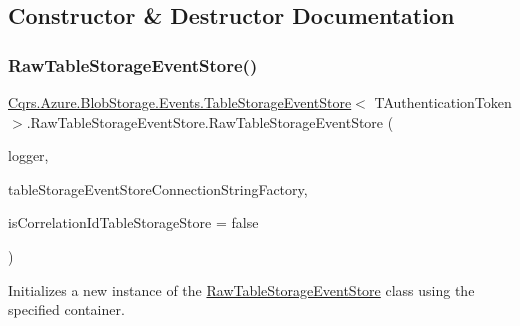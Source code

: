\subsection{Constructor \& Destructor Documentation}
\mbox{\label{classCqrs_1_1Azure_1_1BlobStorage_1_1Events_1_1TableStorageEventStore_1_1RawTableStorageEventStore_aa6aa02462732467a16148e0d094cd308_aa6aa02462732467a16148e0d094cd308}} 
\subsubsection{\texorpdfstring{Raw\+Table\+Storage\+Event\+Store()}{RawTableStorageEventStore()}}
{\footnotesize\ttfamily \hyperlink{classCqrs_1_1Azure_1_1BlobStorage_1_1Events_1_1TableStorageEventStore}{Cqrs.\+Azure.\+Blob\+Storage.\+Events.\+Table\+Storage\+Event\+Store}$<$ T\+Authentication\+Token $>$.Raw\+Table\+Storage\+Event\+Store.\+Raw\+Table\+Storage\+Event\+Store (\begin{DoxyParamCaption}\item[{I\+Logger}]{logger,  }\item[{\hyperlink{interfaceCqrs_1_1Azure_1_1BlobStorage_1_1ITableStorageStoreConnectionStringFactory}{I\+Table\+Storage\+Store\+Connection\+String\+Factory}}]{table\+Storage\+Event\+Store\+Connection\+String\+Factory,  }\item[{bool}]{is\+Correlation\+Id\+Table\+Storage\+Store = {\ttfamily false} }\end{DoxyParamCaption})}



Initializes a new instance of the \hyperlink{classCqrs_1_1Azure_1_1BlobStorage_1_1Events_1_1TableStorageEventStore_1_1RawTableStorageEventStore}{Raw\+Table\+Storage\+Event\+Store} class using the specified container. 



